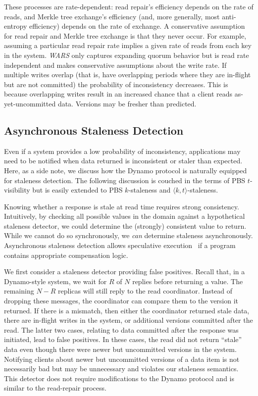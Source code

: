 \documentclass{vldb}
\newcommand{\subsectionskip}{-0em}
\begin{document}
These processes are rate-dependent: read repair's efficiency depends
on the rate of reads, and Merkle tree exchange's efficiency (and, more
generally, most anti-entropy efficiency) depends on the rate of
exchange.  A conservative assumption for read repair and Merkle tree
exchange is that they never occur. For example, assuming a particular
read repair rate implies a given rate of reads from each key in the
system.  \textit{WARS} only captures expanding quorum behavior but is
read rate independent and makes conservative assumptions about the
write rate.  If multiple writes overlap (that is, have overlapping
periods where they are in-flight but are not committed) the
probability of inconsistency decreases.  This is because
overlapping writes result in an increased chance that a client reads
as-yet-uncommitted data.  Versions may be fresher than
predicted.

\vspace{\subsectionskip}\subsection{Asynchronous Staleness Detection}

Even if a system provides a low probability of inconsistency,
applications may need to be notified when data returned is
inconsistent or staler than expected.  Here, as a side note, we
discuss how the Dynamo protocol is naturally equipped for staleness
detection.  The following discussion is couched in the terms of PBS
$t$-visibility but is easily extended to PBS $k$-staleness and
$\langle k, t \rangle$-staleness.

Knowing whether a response is stale at read time requires strong
consistency.  Intuitively, by checking all possible values in the domain against a
hypothetical staleness detector, we could determine the (strongly) consistent
value to return.  While we cannot do so synchronously, we \textit{can}
determine staleness asynchronously.  Asynchronous staleness detection
allows speculative execution~\cite{nsdispeculation} if a program
contains appropriate compensation logic.

We first consider a staleness detector providing false positives.
Recall that, in a Dynamo-style system, we wait for $R$ of $N$ replies
before returning a value.  The remaining $N-R$ replicas will still
reply to the read coordinator.  Instead of dropping these messages,
the coordinator can compare them to the version it returned.  If there
is a mismatch, then either the coordinator returned stale data, there
are in-flight writes in the system, or additional versions committed
after the read. The latter two cases, relating to data committed after
the response was initiated, lead to false positives.  In these cases,
the read did not return ``stale'' data even though there were newer
but uncommitted versions in the system.  Notifying clients about newer
but uncommitted versions of a data item is not necessarily bad but may
be unnecessary and violates our staleness semantics.  This detector
does not require modifications to the Dynamo protocol and is similar
to the read-repair process.
\end{document}
